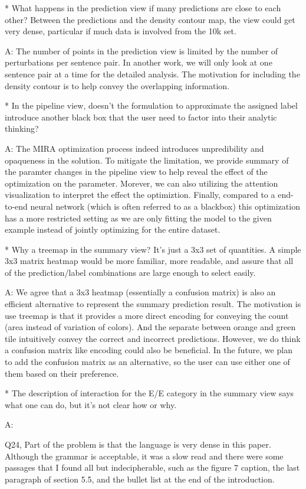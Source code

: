 * What happens in the prediction view if many predictions are close to each other? Between the predictions and the density contour map, the view could get very dense, particular if much data is involved from the 10k set.

A: The number of points in the prediction view is limited by the number of perturbations per sentence pair. In another work, we will only look at one sentence pair at a time for the detailed analysis. The motivation for including the density contour is to help convey the overlapping information.

* In the pipeline view, doesn't the formulation to approximate the assigned label introduce another black box that the user need to factor into their analytic thinking?

A: The MIRA optimization process indeed introduces unpredibility and opaqueness in the solution. To mitigate the limitation, we provide summary of the paramter changes in the pipeline view to help reveal the effect of the optimization on the parameter. Morever, we can also utilizing the attention visualization to interpret the effect the optimiztion. Finally, compared to a end-to-end neural network (which is often referred to as a blackbox) this optimization has a more restricted setting as we are only fitting the model to the given example instead of jointly optimizing for the entire dataset.


* Why a treemap in the summary view? It's just a 3x3 set of quantities. A simple 3x3 matrix heatmap would be more familiar, more readable, and assure that all of the prediction/label combinations are large enough to select easily.

A: We agree that a 3x3 heatmap (essentially a confusion matrix) is also an efficient alternative to represent the summary prediction result. The motivation is use treemap is that it provides a more direct encoding for conveying the count (area instead of variation of colors). And the separate between orange and green tile intuitively convey the correct and incorrect predictions. However, we do think a confusion matrix like encoding could also be beneficial. In the future, we plan to add the confusion matrix as an alternative, so the user can use either one of them based on their preference.

* The description of interaction for the E/E category in the summary view says what one can do, but it's not clear how or why.

A:

Q24, Part of the problem is that the language is very dense in this paper. Although the grammar is acceptable, it was a slow read and there were some passages that I found all but indecipherable, such as the figure 7 caption, the last paragraph of section 5.5, and the bullet list at the end of the introduction.

